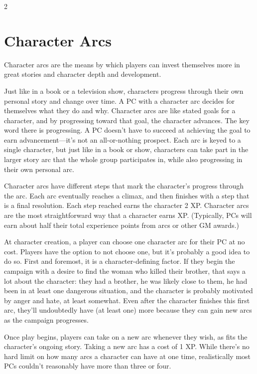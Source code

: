 \begin{multicols}{2}

\chapter{Character Arcs}

Character arcs are the means by which players can invest themselves more in great stories and character depth and development.

Just like in a book or a television show, characters progress through their own personal story and change over time. A PC with a character arc decides for themselves what they do and why. Character arcs are like stated goals for a character, and by progressing toward that goal, the character advances. The key word there is progressing. A PC doesn’t have to succeed at achieving the goal to earn advancement—it’s not an all-or-nothing prospect. Each arc is keyed to a single character, but just like in a book or show, characters can take part in the larger story arc that the whole group participates in, while also progressing in their own personal arc.

Character arcs have different steps that mark the character’s progress through the arc. Each arc eventually reaches a climax, and then finishes with a step that is a final resolution. Each step reached earns the character 2 XP. Character arcs are the most straightforward way that a character earns XP. (Typically, PCs will earn about half their total experience points from arcs or other GM awards.)

At character creation, a player can choose one character arc for their PC at no cost. Players have the option to not choose one, but it’s probably a good idea to do so. First and foremost, it is a character-defining factor. If they begin the campaign with a desire to find the woman who killed their brother, that says a lot about the character: they had a brother, he was likely close to them, he had been in at least one dangerous situation, and the character is probably motivated by anger and hate, at least somewhat. Even after the character finishes this first arc, they’ll undoubtedly have (at least one) more because they can gain new arcs as the campaign progresses. 

Once play begins, players can take on a new arc whenever they wish, as fits the character’s ongoing story. Taking a new arc has a cost of 1 XP. While there’s no hard limit on how many arcs a character can have at one time, realistically most PCs couldn’t reasonably have more than three or four.


\end{multicols}
